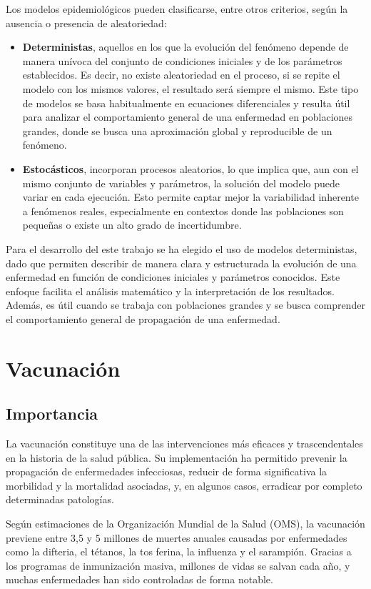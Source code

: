 Los modelos epidemiológicos pueden clasificarse, entre otros criterios, según la ausencia o presencia de aleatoriedad:
\begin{itemize}
    \item \textbf{Deterministas}, aquellos en los que la evolución del fenómeno depende de manera unívoca del conjunto de condiciones iniciales y de los parámetros establecidos. Es decir, no existe aleatoriedad en el proceso, si se repite el modelo con los mismos valores, el resultado será siempre el mismo. Este tipo de modelos se basa habitualmente en ecuaciones diferenciales y resulta útil para analizar el comportamiento general de una enfermedad en poblaciones grandes, donde se busca una aproximación global y reproducible de un fenómeno.
    \item \textbf{Estocásticos}, incorporan procesos aleatorios, lo que implica que, aun con el mismo conjunto de variables y parámetros, la solución del modelo puede variar en cada ejecución. Esto permite captar mejor la variabilidad inherente a fenómenos reales, especialmente en contextos donde las poblaciones son pequeñas o existe un alto grado de incertidumbre.
\end{itemize}
	
Para el desarrollo del este trabajo se ha elegido el uso de modelos deterministas, dado que permiten describir de manera clara y estructurada la evolución de una enfermedad en función de condiciones iniciales y parámetros conocidos. Este enfoque facilita el análisis matemático y la interpretación de los resultados. Además, es útil cuando se trabaja con poblaciones grandes y se busca comprender el comportamiento general de propagación de una enfermedad.



\section{Vacunación}
\subsection{Importancia}
La vacunación constituye una de las intervenciones más eficaces y trascendentales en la historia de la salud pública. Su implementación ha permitido prevenir la propagación de enfermedades infecciosas, reducir de forma significativa la morbilidad y la mortalidad asociadas, y, en algunos casos, erradicar por completo determinadas patologías.

Según estimaciones de la Organización Mundial de la Salud (OMS), la vacunación previene entre 3,5 y 5 millones de muertes anuales causadas por enfermedades como la difteria, el tétanos, la tos ferina, la influenza y el sarampión. Gracias a los programas de inmunización masiva, millones de vidas se salvan cada año, y muchas enfermedades han sido controladas de forma notable.

